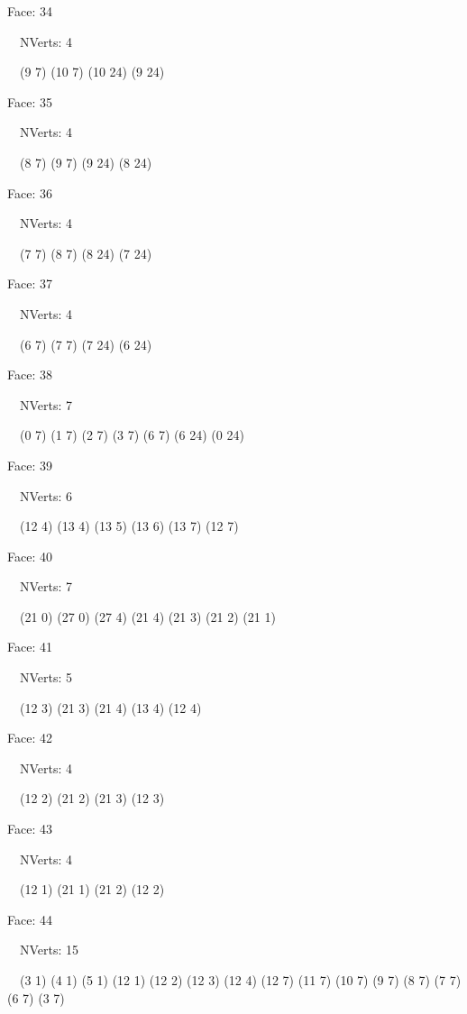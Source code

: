 \documentclass{article}
\begin{document}
{\footnotesize 

Face: 34

\   \    NVerts: 4

 \   \   (9 7) (10 7) (10 24) (9 24)}

{\footnotesize 

Face: 35

\   \    NVerts: 4

 \   \   (8 7) (9 7) (9 24) (8 24)}

{\footnotesize 

Face: 36

\   \    NVerts: 4

 \   \   (7 7) (8 7) (8 24) (7 24)}

{\footnotesize 

Face: 37

\   \    NVerts: 4

 \   \   (6 7) (7 7) (7 24) (6 24)}

{\footnotesize 

Face: 38

\   \    NVerts: 7

 \   \   (0 7) (1 7) (2 7) (3 7) (6 7) (6 24) (0 24)}

{\footnotesize 

Face: 39

\   \    NVerts: 6

 \   \   (12 4) (13 4) (13 5) (13 6) (13 7) (12 7)}

{\footnotesize 

Face: 40

\   \    NVerts: 7

 \   \   (21 0) (27 0) (27 4) (21 4) (21 3) (21 2) (21 1)}

{\footnotesize 

Face: 41

\   \    NVerts: 5

 \   \   (12 3) (21 3) (21 4) (13 4) (12 4)}

{\footnotesize 

Face: 42

\   \    NVerts: 4

 \   \   (12 2) (21 2) (21 3) (12 3)}

{\footnotesize 

Face: 43

\   \    NVerts: 4

 \   \   (12 1) (21 1) (21 2) (12 2)}

{\footnotesize 

Face: 44

\   \    NVerts: 15

 \   \   (3 1) (4 1) (5 1) (12 1) (12 2) (12 3) (12 4) (12 7) (11 7) (10 7) (9 7) (8 7) (7 7) (6 7) (3 7)}
\end{document}
